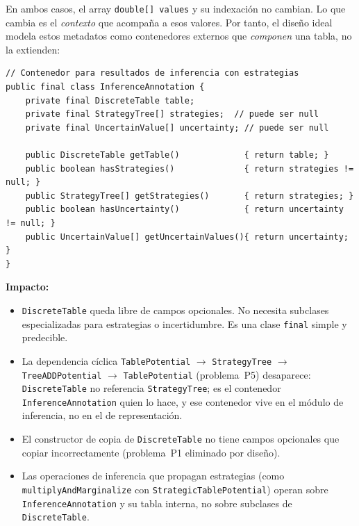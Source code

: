 \documentclass[11pt,a4paper]{article}
\newcommand{\code}[1]{\texttt{#1}}
\begin{document}
En ambos casos, el array \code{double[] values} y su indexación no cambian.
Lo que cambia es el \emph{contexto} que acompaña a esos valores.  Por tanto,
el diseño ideal modela estos metadatos como contenedores externos que
\emph{componen} una tabla, no la extienden:

\begin{lstlisting}[caption={Metadatos como composición externa}]
// Contenedor para resultados de inferencia con estrategias
public final class InferenceAnnotation {
    private final DiscreteTable table;
    private final StrategyTree[] strategies;  // puede ser null
    private final UncertainValue[] uncertainty; // puede ser null

    public DiscreteTable getTable()             { return table; }
    public boolean hasStrategies()              { return strategies != null; }
    public StrategyTree[] getStrategies()       { return strategies; }
    public boolean hasUncertainty()             { return uncertainty != null; }
    public UncertainValue[] getUncertainValues(){ return uncertainty; }
}
\end{lstlisting}

\noindent \textbf{Impacto:}

\begin{itemize}
  \item \code{DiscreteTable} queda libre de campos opcionales.  No necesita
        subclases especializadas para estrategias o incertidumbre.  Es una
        clase \code{final} simple y predecible.

  \item La dependencia cíclica \code{TablePotential} $\to$ \code{StrategyTree}
        $\to$ \code{TreeADDPotential} $\to$ \code{TablePotential} (problema~P5)
        desaparece: \code{DiscreteTable} no referencia \code{StrategyTree};
        es el contenedor \code{InferenceAnnotation} quien lo hace, y ese
        contenedor vive en el módulo de inferencia, no en el de
        representación.

  \item El constructor de copia de \code{DiscreteTable} no tiene campos
        opcionales que copiar incorrectamente (problema~P1 eliminado
        por diseño).

  \item Las operaciones de inferencia que propagan estrategias (como
        \code{multiplyAndMarginalize} con \code{StrategicTablePotential})
        operan sobre \code{InferenceAnnotation} y su tabla interna, no
        sobre subclases de \code{DiscreteTable}.
\end{itemize}
\end{document}
